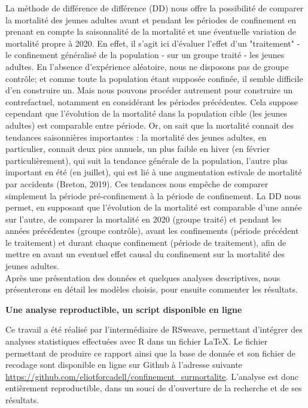 \documentclass[titlepage]{article}
\begin{document}
La méthode de différence de différence (DD) nous offre la possibilité de comparer la mortalité des jeunes adultes avant et pendant les périodes de confinement en prenant en compte la saisonnalité de la mortalité et une éventuelle variation de mortalité propre à 2020. En effet, il s'agit ici d'évaluer l'effet d'un "traitement" - le confinement généralisé de la population - sur un groupe traité - les jeunes adultes. En l'absence d'expérience aléatoire, nous ne disposons pas de groupe contrôle; et comme toute la population étant supposée confinée, il semble difficile d'en construire un. Mais nous pouvons procéder autrement pour construire un contrefactuel, notamment en considérant les périodes précédentes. Cela suppose cependant que l’évolution de la mortalité dans la population cible (les jeunes adultes) est comparable entre période. Or, on sait que la mortalité connait des tendances saisonnières importantes : la mortalité des jeunes adultes, en particulier, connait deux pics annuels, un plus faible en hiver (en février particulièrement), qui suit la tendance générale de la population, l'autre plus important en été (en juillet), qui est lié à une augmentation estivale de mortalité par accidents (Breton, 2019). Ces tendances nous empêche de comparer simplement la période pré-confinement à la période de confinement. La DD nous permet, en supposant que l'évolution de la mortalité est comparable d'une année sur l'autre, de comparer la mortalité en 2020 (groupe traité) et pendant les années précédentes (groupe contrôle), avant les confinements (période précédent le traitement) et durant chaque confinement (période de traitement), afin de mettre en avant un eventuel effet causal du confinement sur la mortalité des jeunes adultes. \\

Après une présentation des données et quelques analyses descriptives, nous présenterons en détail les modèles choisis, pour ensuite commenter les résultats. \\


\begin{tcolorbox}
 \begin{center}
 \textbf{\large Une analyse reproductible, un script disponible en ligne}
 \vspace{0.5mm}
 \end{center}
Ce travail a été réalisé par l'intermédiaire de RSweave, permettant d'intégrer des analyses statistiques effectuées avec R dans un fichier LaTeX. Le fichier permettant de produire ce rapport ainsi que la base de donnée et son fichier de recodage sont  disponible en ligne sur Github à l'adresse suivante \url{https://github.com/eliotforcadell/confinement_surmortalite}. L'analyse est donc entièrement reproductible, dans un souci de d'ouverture de la recherche et de ses résultats.
 \end{tcolorbox}
\end{document}
